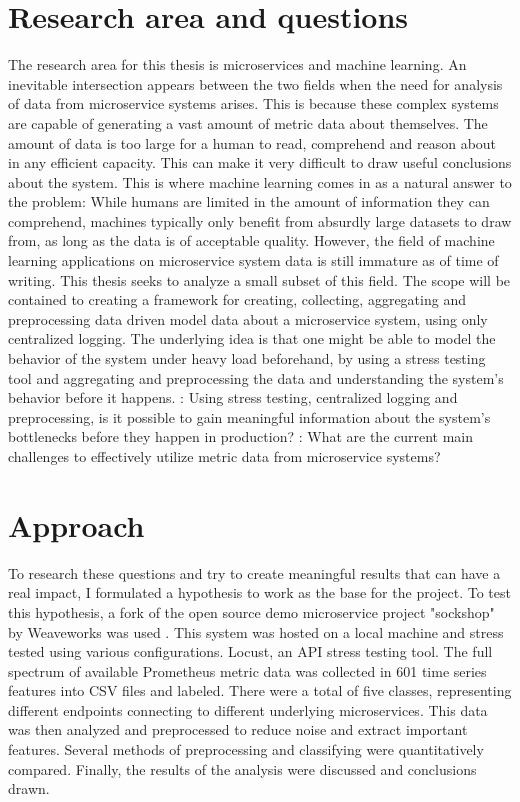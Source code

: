 \section{Research area and questions}
The research area for this thesis is microservices and machine learning. An inevitable intersection appears between the two fields
when the need for analysis of data from microservice systems arises. This is because these complex systems are capable of generating a
vast amount of metric data about themselves. The amount of data is too large for a human to read, comprehend and reason about in any efficient capacity.
This can make it very difficult to draw useful conclusions about the system. This is where machine learning comes in as a natural answer to the problem:
While humans are limited in the amount of information they can comprehend, machines typically only benefit from absurdly large datasets to draw from, as long as
the data is of acceptable quality. However, the field of machine learning applications on microservice system data is still immature as of time of writing.
This thesis seeks to analyze a small subset of this field. The scope will be contained to creating a framework for creating, collecting, aggregating and preprocessing data driven model data about a microservice system, using only centralized logging.
The underlying idea is that one might be able to model the behavior of the system under heavy load beforehand, by using a stress testing tool and aggregating and preprocessing the data and understanding the system's behavior before it happens.
: Using stress testing, centralized logging and preprocessing, is it possible to gain meaningful information about the system's bottlenecks before they happen in production?
: What are the current main challenges to effectively utilize metric data from microservice systems?

\section{Approach}
To research these questions and try to create meaningful results that can have a real impact, I formulated a hypothesis to work as the base for the project.
To test this hypothesis, a fork of the open source demo microservice project "sockshop" by Weaveworks was used \cite*{Microservices-demo-sockshop}. This system was hosted on a local machine and stress tested using various configurations.
Locust, an API stress testing tool. The full spectrum of available Prometheus metric data was collected in 601 time series features into CSV files and labeled. There were a total of five classes, representing different endpoints connecting to different underlying microservices.
This data was then analyzed and preprocessed to reduce noise and extract important features.
Several methods of preprocessing and classifying were quantitatively compared. Finally, the results of the analysis were discussed and conclusions drawn.

